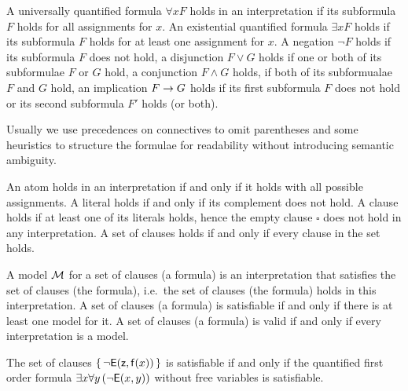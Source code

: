 \begin{definition}\label{def:semantics:FOF}
	A universally quantified formula $\forall x F$ holds in an interpretation if its subformula $F$ holds for all assignments for $x$.
	An existential quantified formula $\exists xF$ holds if its subformula $F$ holds for at least one assignment for $x$.
	A negation $\lnot F$ holds if its subformula $F$ does not hold, 
	a disjunction $F\lor G$ holds if one or both of its subformulae $F$ or $G$ hold,
	a conjunction $F\land G$ holds, if both of its subformualae $F$ and $G$ hold, 
	an implication $F\rightarrow G$ holds if its first subformula $F$ does not hold or its second subformula $F'$ holds (or both).
	\begin{remark}Usually we use precedences on connectives to omit parentheses 
		and some heuristics to structure the formulae for readability 
		without introducing semantic ambiguity.
	\end{remark}
\end{definition}

\begin{definition}\label{def:semantics:CNF}
	An atom holds in an interpretation if and only if it 
	holds with all possible assignments. 
	A literal holds if and only if its complement does not hold.
	A clause holds if at least one of its literals holds,
	hence the empty clause $\square$ does not hold in any interpretation.
	A set of clauses holds if and only if every clause in the set holds.
\end{definition}

\begin{definition}
	A {\myem model} ${\mathcal M}$ for a set of clauses (a formula) is an interpretation that 
	{\myem satisfies} the set of clauses (the formula),
	i.e.~the set of clauses (the formula) holds in this interpretation.
	A set of clauses (a formula) is {\myem satisfiable} if and only if there is at least one model for it. 
	A set of clauses (a formula) is {\myem valid} if and only if every interpretation is a model.
\end{definition}

\begin{example}
	The set of clauses $\{\,\lnot{\mathsf E}({\mathsf z}, {\mathsf f}(x))\,\}$ is satisfiable if and only if the quantified first order formula $\exists x \forall y\,(\lnot {\mathsf E}(x,y))$ without free variables is satisfiable.
\end{example}

